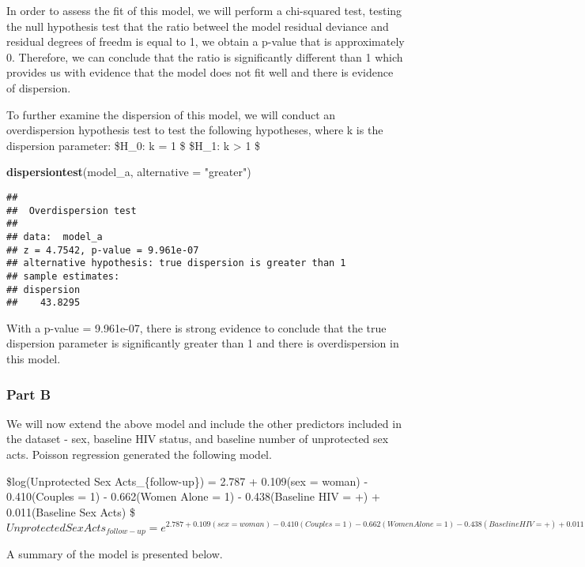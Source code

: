 \documentclass[]{article}
\newenvironment{Shaded}{\begin{snugshade}}{\end{snugshade}}
\newcommand{\KeywordTok}[1]{\textcolor[rgb]{0.13,0.29,0.53}{\textbf{{#1}}}}
\newcommand{\DataTypeTok}[1]{\textcolor[rgb]{0.13,0.29,0.53}{{#1}}}
\newcommand{\StringTok}[1]{\textcolor[rgb]{0.31,0.60,0.02}{{#1}}}
\newcommand{\NormalTok}[1]{{#1}}
\begin{document}
In order to assess the fit of this model, we will perform a chi-squared
test, testing the null hypothesis test that the ratio betweel the model
residual deviance and residual degrees of freedm is equal to 1, we
obtain a p-value that is approximately 0. Therefore, we can conclude
that the ratio is significantly different than 1 which provides us with
evidence that the model does not fit well and there is evidence of
dispersion.

To further examine the dispersion of this model, we will conduct an
overdispersion hypothesis test to test the following hypotheses, where k
is the dispersion parameter: \$H\_0: k = 1 \$ \$H\_1: k \textgreater{} 1
\$

\begin{Shaded}
\begin{Highlighting}[]
\KeywordTok{dispersiontest}\NormalTok{(model_a, }\DataTypeTok{alternative =} \StringTok{"greater"}\NormalTok{)}
\end{Highlighting}
\end{Shaded}

\begin{verbatim}
## 
##  Overdispersion test
## 
## data:  model_a
## z = 4.7542, p-value = 9.961e-07
## alternative hypothesis: true dispersion is greater than 1
## sample estimates:
## dispersion 
##    43.8295
\end{verbatim}

With a p-value = 9.961e-07, there is strong evidence to conclude that
the true dispersion parameter is significantly greater than 1 and there
is overdispersion in this model.

\subsubsection{Part B}\label{part-b}

We will now extend the above model and include the other predictors
included in the dataset - sex, baseline HIV status, and baseline number
of unprotected sex acts. Poisson regression generated the following
model.

\$log(Unprotected Sex Acts\_\{follow-up\}) = 2.787 + 0.109(sex = woman)
- 0.410(Couples = 1) - 0.662(Women Alone = 1) - 0.438(Baseline HIV = +)
+ 0.011(Baseline Sex Acts) \$
\(Unprotected Sex Acts_{follow-up} = e ^ {2.787 + 0.109(sex = woman) - 0.410(Couples = 1) - 0.662(Women Alone = 1) - 0.438(Baseline HIV = +) + 0.011(Baseline Sex Acts)}\)

A summary of the model is presented below.
\end{document}
